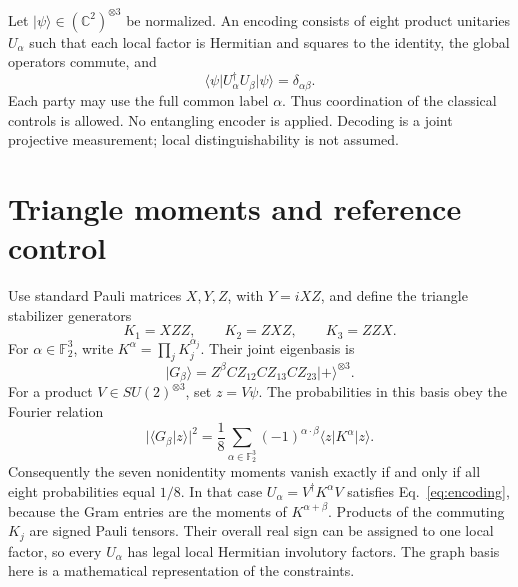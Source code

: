 \documentclass[11pt]{article}
\newcommand{\ket}[1]{\lvert #1\rangle}
\newcommand{\bra}[1]{\langle #1\rvert}
\begin{document}
Let $\ket\psi\in(\mathbb C^2)^{\otimes3}$ be normalized. An encoding consists of eight product unitaries $U_\alpha$ such that each local factor is Hermitian and squares to the identity, the global operators commute, and
\begin{equation}
\bra\psi U_\alpha^\dagger U_\beta\ket\psi=\delta_{\alpha\beta}.
\label{eq:encoding}
\end{equation}
Each party may use the full common label $\alpha$. Thus coordination of the classical controls is allowed. No entangling encoder is applied. Decoding is a joint projective measurement; local distinguishability is not assumed.

\section{Triangle moments and reference control}
Use standard Pauli matrices $X,Y,Z$, with $Y=iXZ$, and define the triangle stabilizer generators
\begin{equation}
K_1=XZZ,\qquad K_2=ZXZ,\qquad K_3=ZZX.
\end{equation}
For $\alpha\in\mathbb F_2^3$, write $K^\alpha=\prod_j K_j^{\alpha_j}$. Their joint eigenbasis is
\begin{equation}
\ket{G_\beta}=Z^\beta CZ_{12}CZ_{13}CZ_{23}\ket+^{\otimes3}.
\end{equation}
For a product $V\in SU(2)^{\otimes3}$, set $z=V\psi$. The probabilities in this basis obey the Fourier relation
\begin{equation}
\bigl|\bra{G_\beta}z\rangle\bigr|^2
=\frac18\sum_{\alpha\in\mathbb F_2^3}(-1)^{\alpha\cdot\beta}
\bra z K^\alpha\ket z.
\label{eq:fourier}
\end{equation}
Consequently the seven nonidentity moments vanish exactly if and only if all eight probabilities equal $1/8$. In that case $U_\alpha=V^\dagger K^\alpha V$ satisfies Eq.~\eqref{eq:encoding}, because the Gram entries are the moments of $K^{\alpha+\beta}$. Products of the commuting $K_j$ are signed Pauli tensors. Their overall real sign can be assigned to one local factor, so every $U_\alpha$ has legal local Hermitian involutory factors. The graph basis here is a mathematical representation of the constraints.
\end{document}
